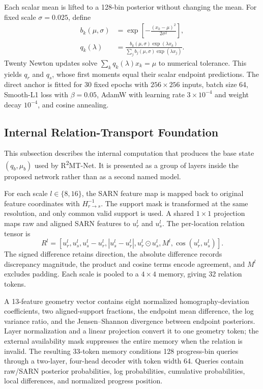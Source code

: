 \documentclass[electronics,article,submit,oneauthor]{Definitions/mdpi}
\newcommand{\modelname}{R\textsuperscript{2}MT-Net}
\begin{document}
Each scalar mean is lifted to a 128-bin posterior without changing the mean. For fixed scale $\sigma=0.025$, define
\begin{align}
b_k(\mu,\sigma)&=\exp\!\left[-\frac{(x_k-\mu)^2}{2\sigma^2}\right], \\
q_k(\lambda)&=\frac{b_k(\mu,\sigma)\exp(\lambda x_k)}{\sum_jb_j(\mu,\sigma)\exp(\lambda x_j)}.
\label{eq:posterior_lift}
\end{align}
Twenty Newton updates solve $\sum_kq_k(\lambda)x_k=\mu$ to numerical tolerance. This yields $q_r$ and $q_s$, whose first moments equal their scalar endpoint predictions. The direct anchor is fitted for 30 fixed epochs with $256\times256$ inputs, batch size 64, Smooth-L1 loss with $\beta=0.05$, AdamW with learning rate $3\times10^{-4}$ and weight decay $10^{-4}$, and cosine annealing.

\subsection{Internal Relation-Transport Foundation}
\label{subsec:base_transport}

This subsection describes the internal computation that produces the base state $(q_b,\mu_b)$ used by \modelname. It is presented as a group of layers inside the proposed network rather than as a second named model.

For each scale $l\in\{8,16\}$, the SARN feature map is mapped back to original feature coordinates with $H_{r\rightarrow s}^{-1}$. The support mask is transformed at the same resolution, and only common valid support is used. A shared $1\times1$ projection maps raw and aligned SARN features to $u_r^l$ and $u_s^l$. The per-location relation tensor is
\begin{equation}
R^l=\left[u_r^l,u_s^l,u_s^l-u_r^l,|u_s^l-u_r^l|,u_r^l\odot u_s^l,M^l,\cos(u_r^l,u_s^l)\right].
\label{eq:relation_tensor}
\end{equation}
The signed difference retains direction, the absolute difference records discrepancy magnitude, the product and cosine terms encode agreement, and $M^l$ excludes padding. Each scale is pooled to a $4\times4$ memory, giving 32 relation tokens.

A 13-feature geometry vector contains eight normalized homography-deviation coefficients, two aligned-support fractions, the endpoint mean difference, the log variance ratio, and the Jensen--Shannon divergence between endpoint posteriors. Layer normalization and a linear projection convert it to one geometry token; the external availability mask suppresses the entire memory when the relation is invalid. The resulting 33-token memory conditions 128 progress-bin queries through a two-layer, four-head decoder with token width 64. Queries contain raw/SARN posterior probabilities, log probabilities, cumulative probabilities, local differences, and normalized progress position.
\end{document}
